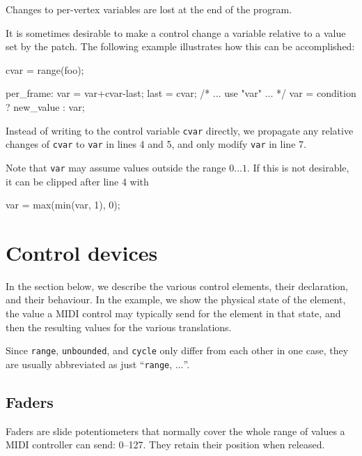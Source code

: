 \documentclass[11pt,a4paper]{article}
\begin{document}
Changes to per-vertex variables are lost at the end of the program.

It is sometimes desirable to make a control change a variable relative
to a value set by the patch. The following example illustrates how
this can be accomplished:

\begin{listing}{1}
cvar = range(foo);

per_frame:
	var = var+cvar-last;
	last = cvar;
	/* ... use "var" ... */
	var = condition ? new_value : var;
\end{listing}

Instead of writing to the control variable {\tt cvar} directly, we
propagate any relative changes of {\tt cvar} to {\tt var} in lines
4 and 5, and only modify {\tt var} in line 7.

Note that {\tt var} may assume values outside the range $0\ldots 1$.
If this is not desirable, it can be clipped after line 4 with

\begin{listing}{1}
	var = max(min(var, 1), 0);
\end{listing}




\section{Control devices}

In the section below, we describe the various control elements, their
declaration, and their behaviour. In the example, we show the physical
state of the element, the value a MIDI control may typically send for
the element in that state, and then the resulting values for the
various translations.

Since {\tt range}, {\tt unbounded}, and {\tt cycle} only differ from
each other in one case, they are usually abbreviated as just
``{\tt range}, $\ldots$''.




\subsection{Faders}

Faders are slide potentiometers that normally cover the whole
range of values a MIDI controller can send: 0--127. They
retain their position when released.
\end{document}
